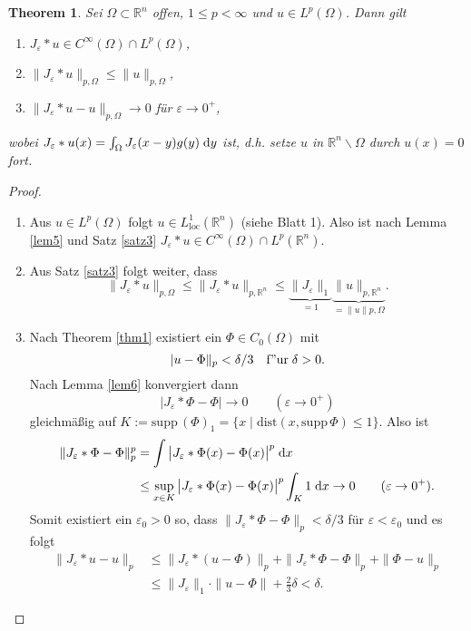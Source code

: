 \documentclass[
paper=a4,
bibtotocnumbered,
liststotocnumbered,
tablecaptionabove,
pointlessnumbers,
twoside,
openright,
10pt
]
{report}
\newcommand{\supp}{\mathrm{supp}\,}
\newcommand{\dist}{\mathrm{dist}}
\let\epsilon\varepsilon
\newtheorem{thm}{Theorem}[chapter]
\theoremstyle{definition}
\numberwithin{equation}{chapter}
\begin{document}
\begin{thm}\label{thm7}
Sei $\Omega\subset\mathbb{R}^n$ offen,  $1\leq p <\infty$ und $u\in L^p(\Omega)$. Dann gilt
\begin{enumerate}[\bf (a)]
\item $J_\epsilon \ast u \in C^\infty(\Omega)\cap L^p(\Omega)$,
\item $\|J_\epsilon\ast u\|_{p,\Omega}\leq \|u\|_{p,\Omega}$,
\item $\|J_\epsilon\ast u -u\|_{p,\Omega}\rightarrow 0$ für $\epsilon\rightarrow 0^+$,
\end{enumerate}
wobei $J_\epsilon\ast u(x)=\int_\Omega J_\epsilon(x-y)g(y)\d y$ ist, d.h. setze $u$ in $\mathbb{R}^n\backslash\Omega$ durch $u(x)=0$ fort.
\end{thm}

\begin{proof}
\begin{enumerate}[\bf (a)]
\item Aus $u\in L^p(\Omega)$ folgt $u\in L_{\mathrm{loc}}^1(\mathbb{R}^n)$ (siehe Blatt 1). Also ist nach Lemma \ref{lem5} und Satz \ref{satz3} $J_\epsilon\ast u\in C^\infty(\Omega)\cap L^p(\mathbb{R}^n)$. 
\item Aus Satz \ref{satz3} folgt weiter, dass
\begin{equation}
\|J_\epsilon\ast u\|_{p,\Omega} 
\leq \|J_\epsilon\ast u\|_{p,\mathbb{R}^n}
\leq \underbrace{\|J_\epsilon\|_1}_{=1}\underbrace{\|u\|_{p,\mathbb{R}^n}}_{=\|u\|{p,\Omega}}.
\end{equation}
\item Nach Theorem \ref{thm1} existiert ein $\Phi\in C_0(\Omega)$ mit 
\begin{equation}
|u-\Phi\|_p <\delta/3 \quad\mathrm{f"ur}\;\delta >0.
\end{equation}
 Nach Lemma \ref{lem6} konvergiert dann
\begin{equation}
|J_\epsilon\ast \Phi -\Phi|\rightarrow 0\qquad (\epsilon\rightarrow 0^+)
\end{equation}
gleichmäßig auf $K:=\supp (\Phi)_1=\{x\mid \dist(x,\supp\Phi)\leq 1\}$. Also ist
\begin{align}
\|J_\epsilon\ast \Phi-\Phi\|_p^p 
&= \int \big| J_\epsilon\ast\Phi(x)-\Phi(x) \big|^p\d x \\
&\leq \sup\limits_{x\in K} \big| J_\epsilon\ast\Phi(x)-\Phi(x) \big|^p \int_K 1\d x\rightarrow 0 \qquad (\epsilon\rightarrow 0^+).
\end{align}
Somit existiert ein $\epsilon_0 >0$ so, dass $\|J_\epsilon\ast \Phi-\Phi\|_p <\delta/3$ für $\epsilon<\epsilon_0$ und es folgt
\begin{align}
\|J_\epsilon\ast u-u\|_p 
&\leq \|J_\epsilon\ast (u-\Phi)\|_p +\|J_\epsilon\ast \Phi-\Phi\|_p +\|\Phi-u\|_p \\
&\leq \|J_\epsilon\|_1\cdot \|u-\Phi\| +\frac{2}{3}\delta <\delta.
\end{align}
\end{enumerate}
\end{proof}
\end{document}
